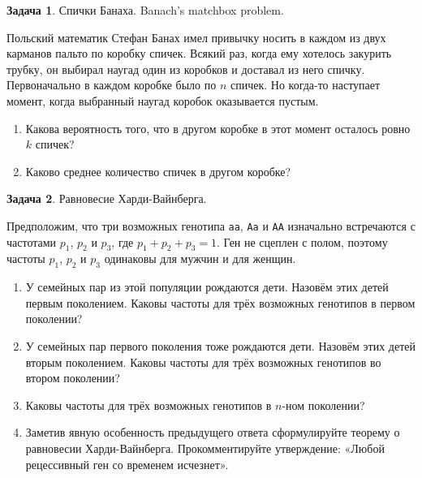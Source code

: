 \documentclass[nobib]{tufte-handout}
\theoremstyle{definition}
\newtheorem{problem}{Задача}
\begin{document}
\begin{problem}
Спички Банаха. Banach's matchbox problem.

Польский математик Стефан Банах имел привычку носить в каждом из двух карманов пальто по коробку спичек. Всякий раз, когда ему хотелось закурить трубку, он выбирал наугад один из коробков и доставал из него спичку. Первоначально в каждом коробке было по $n$ спичек. Но когда-то наступает момент, когда выбранный наугад коробок оказывается пустым.

\begin{enumerate}
\item Какова вероятность того, что в другом коробке в этот момент осталось ровно $k$ спичек?
\item Каково среднее количество спичек в другом коробке?
\end{enumerate}

\begin{sol}
\end{sol}

\end{problem}


\begin{problem}
Равновесие Харди-Вайнберга.

Предположим, что три возможных генотипа \verb|aa|, \verb|Aa| и \verb|AA| изначально встречаются с частотами $p_1$, $p_2$ и $p_3$, где $p_1+p_2+p_3=1$. Ген не сцеплен с полом, поэтому частоты $p_1$, $p_2$ и $p_3$ одинаковы для мужчин и для женщин.
\begin{enumerate}
\item У семейных пар из этой популяции рождаются дети. Назовём этих детей первым поколением. Каковы частоты для трёх возможных генотипов в первом поколении?
\item У семейных пар первого поколения тоже рождаются дети. Назовём этих детей вторым поколением. Каковы частоты для трёх возможных генотипов во втором поколении?
\item Каковы частоты для трёх возможных генотипов в $n$-ном поколении?
\item Заметив явную особенность предыдущего ответа сформулируйте теорему о равновесии Харди-Вайнберга. Прокомментируйте утверждение: «Любой рецессивный ген со временем исчезнет».
\end{enumerate}

\begin{sol}
\end{sol}

\end{problem}
\end{document}
